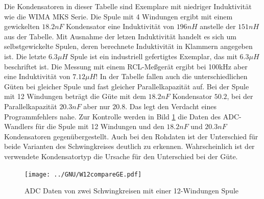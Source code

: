 Die Kondensatoren in dieser Tabelle sind Exemplare mit niedriger Induktivität wie
die WIMA MKS Serie. Die Spule mit 4 Windungen ergibt mit einem gewickelten \(18.2nF\)
Kondensator eine Induktivität von \(196nH\) anstelle der \(151nH\) aus der Tabelle.
Mit Ausnahme der letzen Induktivität handelt es sich um selbstgewickelte Spulen,
deren berechnete Induktivität in Klammern angegeben ist. Die letzte \(6.3\mu H\) Spule
ist ein industriell gefertigtes Exemplar, das mit \(6.3\mu H\) beschriftet ist.
Die Messung mit einem RCL-Meßgerät ergibt bei 100kHz aber eine Induktivität von \(7.12\mu H\)!
In der Tabelle fallen auch die unterschiedlichen Güten bei gleicher Spule und fast gleicher
Parallelkapazität auf. Bei der Spule mit 12 Windungen beträgt die Güte mit dem \(18.2nF\)
Kondensator \(50.2\), bei der Parallelkapazität \(20.3nF\) aber nur \(20.8\).
Das legt den Verdacht eines Programmfehlers nahe.
Zur Kontrolle werden in Bild \ref{fig:W12compare} die Daten des ADC-Wandlers 
für die Spule mit 12 Windungen und den \(18.2nF\) und \(20.3nF\) Kondensatoren gegenübergestellt.
Auch bei den Rohdaten ist der Unterschied für beide Varianten des Schwingkreises deutlich
zu erkennen. Wahrscheinlich ist der verwendete Kondensatortyp die Ursache für den Unterschied
bei der Güte.

\begin{figure}[H]
\centering
\texttt{[image: ../GNU/W12compareGE.pdf]}
\caption{ADC Daten von zwei Schwingkreisen mit einer 12-Windungen Spule}
\label{fig:W12compare}
\end{figure}

